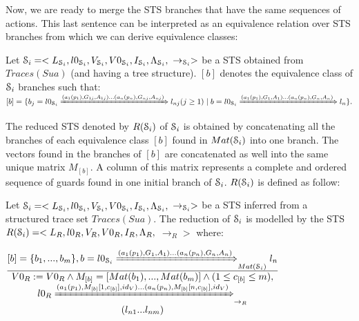Now, we are ready to merge the STS branches that have the same
sequences of actions. This last sentence can be interpreted as an
equivalence relation over STS branches from which we can derive
equivalence classes:

\begin{definition}
Let
$\EuScript{S}_i=<L_{\EuScript{S}_i},l0_{\EuScript{S}_i},V_{\EuScript{S}_i},V0_{\EuScript{S}_i},I_{\EuScript{S}_i},\Lambda_{\EuScript{S}_i},$
$\rightarrow_{\EuScript{S}_i}>$ be a STS obtained from
$Traces(Sua)$ (and having a tree structure). $[b]$ denotes the
equivalence class of $\EuScript{S}_i$ branches such that: $[b]=\{
b_j= l0_{\EuScript{S}_i}\\
\xRightarrow{(a_1(p_1),G_{1j},A_{1j})\dots(a_n(p_n),G_{nj},A_{nj})}
l_{nj}(j\geq 1) \mid b=l0_{\EuScript{S}_i}
\xRightarrow{(a_1(p_1),G_{1},A_{1})\dots(a_n(p_n),G_{n},A_{n})}
l_n\}.$
\end{definition}


The reduced STS denoted by $R(\EuScript{S}_i)$ of $\EuScript{S}_i$
is obtained by concatenating all the branches of each equivalence
class $[b]$ found in $Mat(\EuScript{S}_i)$ into one branch. The
vectors found in the branches of $[b]$ are concatenated as well
into the same unique matrix $M_{[b]}$. A column of this matrix
represents a complete and ordered sequence of guards found in one
initial branch of $\EuScript{S}_i$. $R(\EuScript{S}_i)$ is
defined as follow:

\begin{definition}
	\label{rule:min}

	Let $\EuScript{S}_i=<L_{\EuScript{S}_i},l0_{\EuScript{S}_i},V_{\EuScript{S}_i},V0_{\EuScript{S}_i},I_{\EuScript{S}_i},\Lambda_{\EuScript{S}_i},$ $\rightarrow_{\EuScript{S}_i}>$ be
    a STS inferred from a structured trace set $Traces(Sua)$. The reduction of $\EuScript{S}_i$ is modelled by the STS
	$R(\EuScript{S}_i)= <L_R,l0_R,V_R,V0_R,I_R,\Lambda_R,$
	$\rightarrow_R>$ where:

  \begin{center}
  $\frac{\begin{matrix}
      [b]=\{b_1,...,b_m\},
      b=l0_{\EuScript{S}_i} \xRightarrow{(a_1(p_1),G_{1},A_{1})...(a_n(p_n),G_{n},A_{n})}_{Mat(\EuScript{S}_i)} l_{n}\\
    \end{matrix}
  }
  {\begin{matrix}
      V0_R:=V0_R \wedge M_{[b]}=[Mat(b_1),...,Mat(b_m)] \wedge (1 \leq c_{[b]} \leq m),\\
      l0_R \xRightarrow{(a_1(p_1),M_{[b]}[1,c_{[b]}],id_V)... (a_n(p_n),M_{[b]}[n,c_{[b]}],id_V)}_{\rightarrow_R}\\  (l_{n1}...l_{nm})
    \end{matrix}
  }$
  \end{center}
\end{definition}

